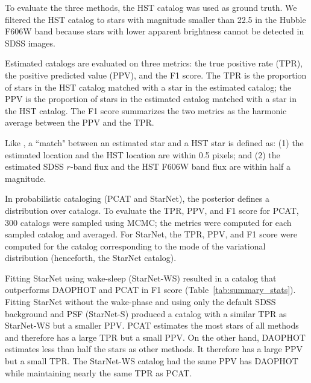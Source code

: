 To evaluate the three methods, the HST catalog was used as ground truth. 
We filtered the HST catalog to stars with magnitude smaller than 22.5 in the Hubble F606W band because stars with lower apparent brightness cannot be detected in SDSS images. 


Estimated catalogs are evaluated on three metrics: the true positive rate (TPR), the positive predicted value (PPV), and the F1 score. The TPR is the proportion of stars in the HST catalog matched with a star in the estimated catalog;
the PPV is the proportion of stars in the estimated catalog matched with a star in the HST catalog. The F1 score summarizes the two metrics as the harmonic average between the PPV and the TPR.

Like \cite{Portillo_2017, Feder_2019}, a ``match" between an estimated star and a HST star is defined as: (1) the estimated location and the HST location are within 0.5 pixels; and (2) the estimated SDSS $r$-band flux and the HST F606W band flux are within half a magnitude. 

In probabilistic cataloging (PCAT and StarNet), the posterior defines a distribution over catalogs. 
To evaluate the TPR, PPV, and F1 score for PCAT, 300 catalogs were sampled using MCMC; the metrics were computed for each sampled catalog and averaged. 
For StarNet, the TPR, PPV, and F1 score were computed for the catalog corresponding to the mode of the variational distribution (henceforth, the StarNet catalog). 


Fitting StarNet using wake-sleep (StarNet-WS) resulted in a catalog that outperforms DAOPHOT and PCAT in F1 score (Table~\ref{tab:summary_stats}). 
Fitting StarNet without the wake-phase
and using only the default SDSS background and PSF (StarNet-S) produced a catalog with a similar TPR as StarNet-WS but a smaller PPV. 
PCAT estimates the most stars of all methods and therefore has a large TPR but a small PPV. 
On the other hand, DAOPHOT estimates less than half the stars as other methods. It therefore has a large PPV but a small TPR. 
The StarNet-WS catalog had the same PPV has DAOPHOT while maintaining nearly the same TPR as PCAT. 

